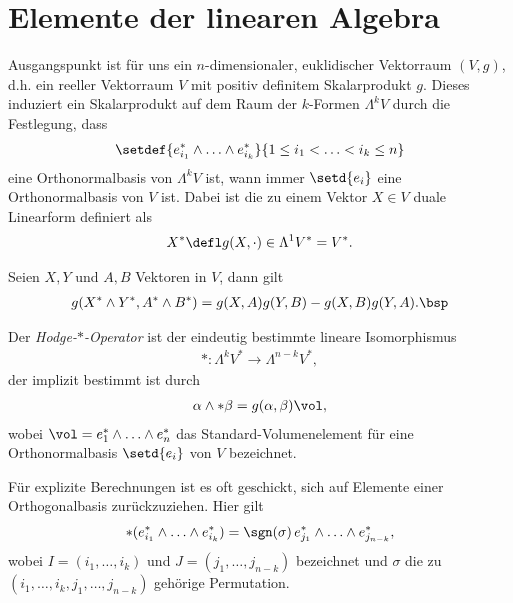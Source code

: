 \documentclass[%
	paper=a5,%
	fleqn,%
	DIV=18,%
	BCOR=0mm,
	fontsize=11pt,
	titlepage=false,%
	bibliography=totoc,
	DIV=18,%
	twoside=true,
	pdftitle=Riemannsche Geometrie,
	pdfauthor=Uwe Semmelmann,
	numbers=noendperiod]%
	{scrbook}
\begin{document}
\section{Elemente der linearen Algebra}

Ausgangspunkt ist für uns ein $n$-dimensionaler, euklidischer Vektorraum $(V,g)$, d.h. ein reeller Vektorraum $V$ mit positiv definitem Skalarprodukt $g$. Dieses induziert ein Skalarprodukt auf dem Raum der $k$-Formen $\Lambda^kV$ durch die Festlegung, dass
\begin{align*}
\setdef{e_{i_{1}}^*\wedge \ldots \wedge e_{i_{k}}^*}{1\le i_{1}< \ldots < i_{k} \le n}
\end{align*}
eine Orthonormalbasis von $\Lambda^k V$ ist, wann immer $\setd{e_{i}}$ eine Orthonormalbasis von $V$ ist. Dabei ist die zu einem Vektor $X\in V$ duale Linearform definiert als
\begin{align*}
X^* \defl g(X,\cdot) \in\Lambda^1 V^* = V^*.
\end{align*}

\begin{ex}
Seien $X,Y$ und $A,B$ Vektoren in $V$, dann gilt
\begin{align*}
g(X^*\wedge Y^*, A^*\wedge B^*) = g(X,A)g(Y,B) - g(X,B)g(Y,A).\bsp
\end{align*}
\end{ex}

\begin{defn}
Der \emph{Hodge-$*$-Operator} ist der eindeutig bestimmte lineare Isomorphismus
\begin{align*}
* : \Lambda^k V^*\to \Lambda^{n-k}V^*,
\end{align*}
der implizit bestimmt ist durch
\begin{align*}
\alpha\wedge * \beta = g(\alpha,\beta)\vol,
\end{align*}
wobei $\vol = e_{1}^*\wedge \ldots \wedge e_{n}^*$ das Standard-Volumenelement für eine Orthonormalbasis $\setd{e_{i}}$ von $V$ bezeichnet.\fish
\end{defn}

\begin{rem}
Für explizite Berechnungen ist es oft geschickt, sich auf Elemente einer Orthogonalbasis zurückzuziehen. Hier gilt
\begin{align*}
*(e_{i_{1}}^*\wedge \ldots \wedge e_{i_{k}}^*) = \sgn(\sigma)\, e_{j_{1}}^*\wedge \ldots \wedge e_{j_{n-k}}^*,
\end{align*}
wobei $I=(i_{1},\ldots,i_{k})$ und $J=(j_{1},\ldots,j_{n-k})$ bezeichnet und $\sigma$ die zu $(i_{1},\ldots,i_{k},j_{1},\ldots,j_{n-k})$ gehörige Permutation.\map
\end{rem}
\end{document}
